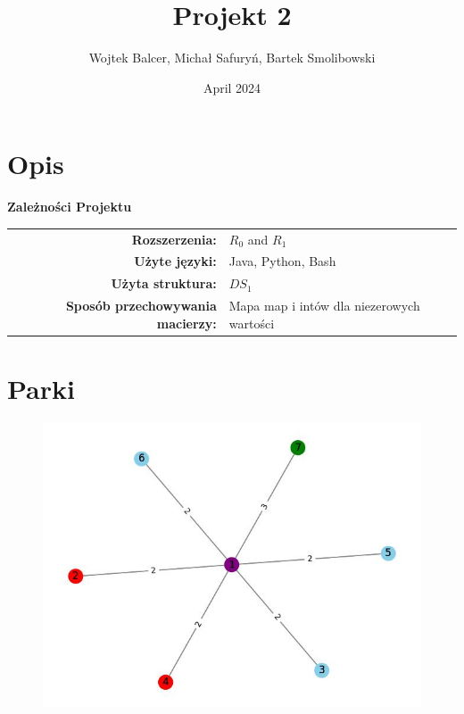 \documentclass{article}
\title{Projekt 2}
\author{Wojtek Balcer, Michał Safuryń, Bartek Smolibowski}
\date{April 2024}
\begin{document}
\maketitle
\section{Opis}

\noindent
\textbf{Zależności Projektu} \\
\begin{tabular}{>{\bfseries}rl}
Rozszerzenia: & $R_0$ and $R_1$ \\
Użyte języki: & Java, Python, Bash \\
Użyta struktura: & $DS_1$ \\
Sposób przechowywania macierzy: & Mapa map i intów dla niezerowych wartości \\
\end{tabular}

\clearpage

\section{Parki}

\begin{figure}[ht!]
    \centering
    \includegraphics[width=1\linewidth]{2.jpg}
    \label{fig:my_label}
\end{figure}
\end{document}
